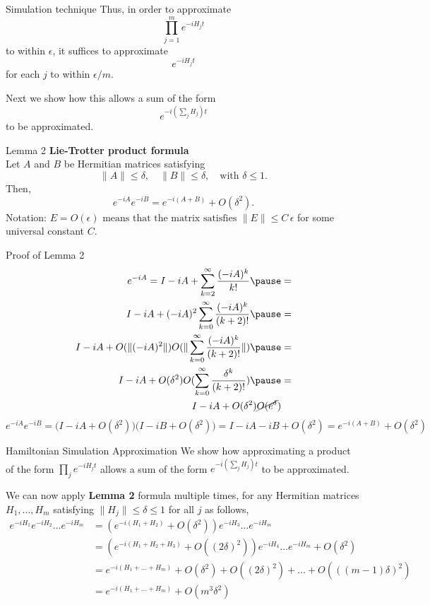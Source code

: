 \documentclass[aspectratio=169,xcolor=dvipsnames]{beamer}
\begin{document}
\begin{frame}{Simulation technique}
Thus, in order to approximate 
\[
\prod_{j=1}^m e^{-iH_j t}
\]
to within \(\epsilon\), it suffices to approximate 
\[
e^{-iH_j t}
\]
for each \(j\) to within \(\epsilon/m\). 

\vspace{1em}
Next we show how this allows a sum of the form 
\[
e^{-i\left(\sum_{j} H_j\right)t}
\]
to be approximated.
\end{frame}

\begin{frame}{Lemma 2}
\textbf{Lie-Trotter product formula} \\
Let \(A\) and \(B\) be Hermitian matrices satisfying
\[
\|A\| \le \delta, \quad \|B\| \le \delta, \quad \text{with } \delta \le 1.
\]
Then,
\[
e^{-iA} e^{-iB} = e^{-i(A+B)} + O(\delta^2).
\]
Notation: \( E = O(\epsilon) \text{ means that the matrix satisfies }
\|E\| \le C\,\epsilon
\) for some universal constant $C$.

\end{frame}

\begin{frame}{Proof of Lemma 2}
\[
\begin{aligned}
e^{-iA} = I - iA + \sum_{k=2}^{\infty} \frac{(-iA)^k}{k!}
\pause
&= \\ I - iA + (-iA)^2 \sum_{k=0}^{\infty} \frac{(-iA)^k}{(k+2)!}
\pause
&= \\ I - iA + O(\|(-iA)^2\|) O(\|\sum_{k=0}^{\infty} \frac{(-iA)^k}{(k+2)!}\|)
\pause
&= \\ I - iA + O(\delta^2) O(\sum_{k=0}^{\infty} \frac{\delta^k}{(k+2)!})
\pause
&= \\ I - iA + O(\delta^2) \cancel{O(e^{\delta}})
\end{aligned}
\]
\pause
\[
e^{-iA} e^{-iB}
= \bigl(I - iA + O(\delta^2)\bigr)\bigl(I - iB + O(\delta^2)\bigr)
= I - iA - iB + O(\delta^2)
= e^{-i(A+B)} + O(\delta^2)
\]
\end{frame}


\begin{frame}{Hamiltonian Simulation Approximation}
We show how approximating a product of the form \(\prod_{j} e^{-iH_j t}\) allows a sum of the form \(e^{-i(\sum_{j} H_j )t}\) to be approximated.\newline\pause

We can now apply \textbf{Lemma 2} formula multiple times, for any Hermitian matrices \( H_1, \dots, H_m \) satisfying \( \|H_j\| \leq \delta \leq 1 \) for all \( j \) as follows,\pause
\begin{align*}
e^{-iH_1} e^{-iH_2} \dots e^{-iH_m} &= 
\left( e^{-i(H_1+H_2)} + O(\delta^2) \right) e^{-iH_3} \dots e^{-iH_m} \\  
&= \left( e^{-i(H_1+H_2+H_3)} + O((2\delta)^2) \right) e^{-iH_4} \dots e^{-iH_m} + O(\delta^2) \\  
&= e^{-i(H_1+\dots+H_m)} + O(\delta^2) + O((2\delta)^2) + \dots + O(((m-1)\delta)^2) \\  
&= e^{-i(H_1+\dots+H_m)} + O(m^3\delta^2)
\end{align*}
\end{frame}
\end{document}
